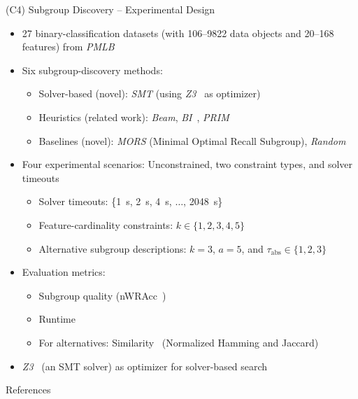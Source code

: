 \documentclass[en, navbarinline, handout]{sdqbeamer}
\begin{document}
\begin{frame}[t]{(C4) Subgroup Discovery -- Experimental Design}
	\begin{itemize}
		\item 27 binary-classification datasets (with 106--9822 data objects and 20--168 features) from \emph{PMLB}~\cite{olson2017pmlb, romano2021pmlb}
		\item Six subgroup-discovery methods:
		\begin{itemize}
			\item Solver-based (novel): \emph{SMT} (using \emph{Z3}~\cite{bjorner2015nuz, deMoura2008z3} as optimizer)
			\item Heuristics (related work): \emph{Beam}, \emph{BI}~\cite{mampaey2012efficient}, \emph{PRIM}~\cite{friedman1999bump}
			\item Baselines (novel): \emph{MORS} (Minimal Optimal Recall Subgroup), \emph{Random}
		\end{itemize}
		\item Four experimental scenarios: Unconstrained, two constraint types, and solver timeouts
		\begin{itemize}
			\item Solver timeouts: \{1~s, 2~s, 4~s, $\dots$, 2048~s\}
			\item Feature-cardinality constraints: $k \in \{1, 2, 3, 4, 5\}$
			\item Alternative subgroup descriptions: $k=3$, $a=5$, and $\tau_{\text{abs}} \in \{1, 2, 3\}$
		\end{itemize}
		\item Evaluation metrics:
		\begin{itemize}
			\item Subgroup quality (nWRAcc~\cite{lavravc1999rule, mathonat2021anytime})
			\item Runtime
			\item For alternatives: Similarity~\cite{choi2010survey} (Normalized Hamming and Jaccard)
		\end{itemize}
		\item \emph{Z3}~\cite{bjorner2015nuz, deMoura2008z3} (an SMT solver) as optimizer for solver-based search
	\end{itemize}
\end{frame}

\begin{frame}[t, allowframebreaks]{References}
	\renewcommand*{\bibfont}{\small} %
	\printbibliography
\end{frame}

\backupend
\end{document}

